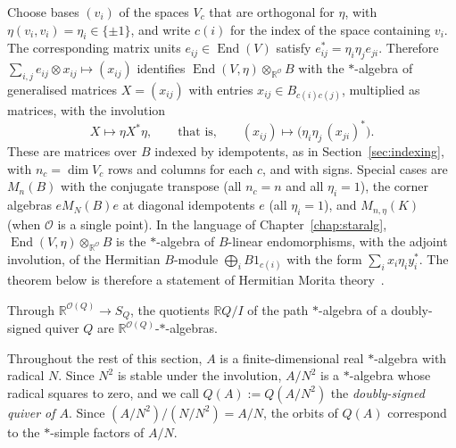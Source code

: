 \documentclass[12pt, a4paper]{report}
\theoremstyle{plain}
\theoremstyle{definition}
\theoremstyle{remark}
\theoremstyle{plain}
\newcommand{\RR}{\mathbb{R}}
\DeclareMathOperator{\End}{End}
\begin{document}
Choose bases $(v_i)$ of the spaces $V_c$ that are orthogonal for $\eta$, with $\eta(v_i,v_i)=\eta_i\in\{\pm1\}$, and write $c(i)$ for the index of the space containing $v_i$. The corresponding matrix units $e_{ij}\in\End(V)$ satisfy $e_{ij}^*=\eta_i\eta_je_{ji}$. Therefore $\sum_{i,j}e_{ij}\otimes x_{ij}\mapsto(x_{ij})$ identifies $\End(V,\eta)\otimes_{\RR^{\mathcal O}}B$ with the $*$-algebra of generalised matrices $X=(x_{ij})$ with entries $x_{ij}\in B_{c(i)c(j)}$, multiplied as matrices, with the involution
\begin{equation}\label{eq:signed-adjoint}
  X\longmapsto\eta X^*\eta,\qquad\text{that is,}\qquad (x_{ij})\longmapsto\bigl(\eta_i\eta_j\,(x_{ji})^*\bigr).
\end{equation}
These are matrices over $B$ indexed by idempotents, as in Section~\ref{sec:indexing}, with $n_c=\dim V_c$ rows and columns for each $c$, and with signs. Special cases are $M_n(B)$ with the conjugate transpose (all $n_c=n$ and all $\eta_i=1$), the corner algebras $eM_N(B)e$ at diagonal idempotents $e$ (all $\eta_i=1$), and $M_{n,\eta}(K)$ (when $\mathcal O$ is a single point). In the language of Chapter~\ref{chap:staralg}, $\End(V,\eta)\otimes_{\RR^{\mathcal O}}B$ is the $*$-algebra of $B$-linear endomorphisms, with the adjoint involution, of the Hermitian $B$-module $\bigoplus_iB1_{c(i)}$ with the form $\sum_ix_i\eta_iy_i^*$. The theorem below is therefore a statement of Hermitian Morita theory~\cite[Ch.~I, \S9]{Knus1991}.

Through $\RR^{\mathcal O(Q)}\to S_Q$, the quotients $\RR Q/I$ of the path $*$-algebra of a doubly-signed quiver $Q$ are $\RR^{\mathcal O(Q)}$-$*$-algebras.

Throughout the rest of this section, $A$ is a finite-dimensional real $*$-algebra with radical $N$. Since $N^2$ is stable under the involution, $A/N^2$ is a $*$-algebra whose radical squares to zero, and we call $Q(A):=Q(A/N^2)$ the \emph{doubly-signed quiver of $A$}. Since $(A/N^2)/(N/N^2)=A/N$, the orbits of $Q(A)$ correspond to the $*$-simple factors of $A/N$.
\end{document}
